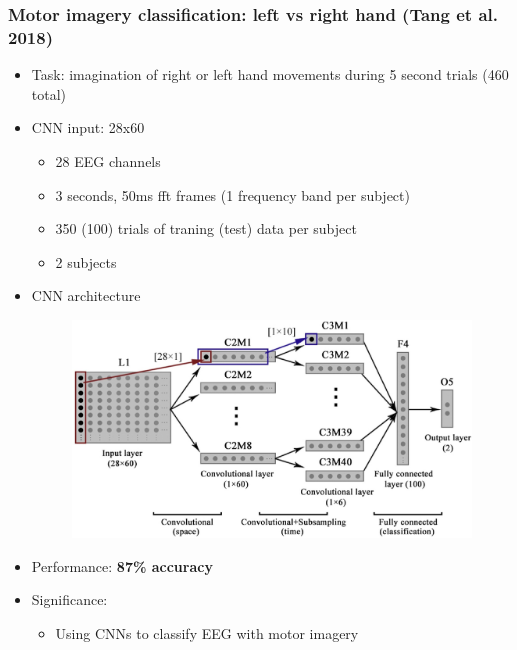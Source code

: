 \documentclass{beamer}
\begin{document}
\begin{frame}
	\frametitle{Motor imagery classification: left vs right hand (Tang et al. 2018)}
	
	\begin{itemize}

		\item Task: imagination of right or left hand movements during 5 second trials (460 total)

		\item CNN input: 28x60 
		\begin{itemize}
			\item 28 EEG channels
			\item 3 seconds, 50ms fft frames (1 frequency band per subject)
			\item 350 (100) trials of traning (test) data per subject 
			\item 2 subjects
		\end{itemize}
		
		\item CNN architecture
		\begin{figure}
			\centering
			\includegraphics[scale=0.85]{fig7.jpg}
		\end{figure}
	
		\item Performance: \textbf{87\% accuracy}

		\item Significance: 
		\begin{itemize}
			\item Using CNNs to classify EEG with motor imagery
		\end{itemize}	

	\end{itemize}

\end{frame}
\end{document}
